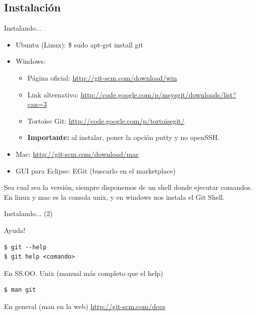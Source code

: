 \documentclass{beamer}
\begin{document}
\subsection{Instalación}
\begin{frame}[fragile]{Instalando...} 
  \begin{block}{}
      \begin{itemize}
      \item Ubuntu (Linux): \$ sudo apt-get install git \pause
	\item	 Windows: \begin{itemize}
			\item Página oficial: \url{http://git-scm.com/download/win} 
			\item Link alternativo: \url{http://code.google.com/p/msysgit/downloads/list?can=3}
			\item Tortoise Git: \url{http://code.google.com/p/tortoisegit/}
			\item \textbf{Importante:} al instalar, poner la opción putty y no openSSH.
		      \end{itemize} \pause
      \item Mac: \url{http://git-scm.com/download/mac} \pause
      \item GUI para Eclipse: EGit (buscarlo en el marketplace)
      \end{itemize}
  
    Sea cual sea la versión, siempre disponemos de un shell donde ejecutar comandos. En linux y mac es la consola unix,
    y en windows nos instala el Git Shell. 
  \end{block}
  
\end{frame}

\begin{frame}[fragile]{Instalando... (2)}
  \begin{block}{Ayuda!}
    \begin{verbatim}
$ git --help
$ git help <comando>
     \end{verbatim}
  \end{block} \pause
  \begin{block}{En SS.OO. Unix (manual más completo que el help)}
    \begin{verbatim}
$ man git
     \end{verbatim}
  \end{block} \pause
  \begin{block}{En general (man en la web)}
    \url{http://git-scm.com/docs}
  \end{block}
\end{frame}
\end{document}
